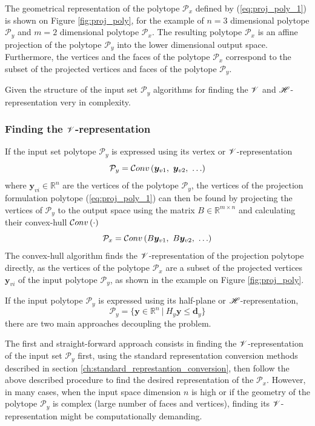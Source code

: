 The geometrical representation of the polytope $\mathcal{P}_x$ defined by (\ref{eq:proj_poly_1}) is shown on Figure \ref{fig:proj_poly}, for the example of $n=3$ dimensional polytope $\mathcal{P}_y$ and $m=2$ dimensional polytope $\mathcal{P}_x$. The resulting polytope $\mathcal{P}_x$ is an affine projection of the polytope $\mathcal{P}_y$ into the lower dimensional output space. Furthermore, the vertices and the faces of the polytope $\mathcal{P}_x$ correspond to the subset of the projected vertices and faces of the polytope $\mathcal{P}_y$. 


Given the structure of the input set $\mathcal{P}_y$ algorithms for finding the $\mathscr{V}$ and $\mathscr{H}$-representation very in complexity. 

\subsubsection{Finding the $\mathscr{V}$-representation}
\label{ch:proj_algos_v}
If the input set polytope $\mathcal{P}_y$ is expressed using its vertex or $\mathscr{V}$-representation
\begin{equation}
    \mathcal{P}_y = \mathcal{C}onv\left( \bm{y}_{v1}, ~ \bm{y}_{v2},~ \ldots\right)
\end{equation}
where $\bm{y}_{vi}\in\mathbb{R}^n$ are the vertices of the polytope $\mathcal{P}_y$, the vertices of the projection formulation polytope (\ref{eq:proj_poly_1}) can then be found by projecting the vertices of $\mathcal{P}_y$ to the output space using the matrix $B \in \mathbb{R}^{m\times n}$ and calculating their convex-hull $\mathcal{C}onv\left(\cdot\right)$
\begin{equation}
    \mathcal{P}_x= \mathcal{C}onv\left( B\bm{y}_{v1}, ~ B\bm{y}_{v2},~ \ldots\right)
\end{equation}
The convex-hull algorithm finds the $\mathscr{V}$-representation of the projection polytope directly, as the vertices of the polytope $\mathcal{P}_x$ are a subset of the projected vertices $\bm{y}_{vi}$ of the input polytope $\mathcal{P}_y$, as shown in the example on Figure \ref{fig:proj_poly}. 

If the input polytope $\mathcal{P}_y$ is expressed using its half-plane or $\mathscr{H}$-representation, 
\begin{equation}
    \mathcal{P}_y = \{ \bm{y}\in\mathbb{R}^n ~|~H_y\bm{y} \leq \bm{d}_y\}
\end{equation}
there are two main approaches decoupling the problem.

The first and straight-forward approach consists in finding the $\mathscr{V}$-representation of the input set $\mathcal{P}_y$ first, using the standard representation conversion methods described in section \ref{ch:standard_represtantion_conversion}, then follow the above described procedure to find the desired representation of the $\mathcal{P}_x$. However, in many cases, when the input space dimension $n$ is high or if the geometry of the polytope  $\mathcal{P}_y$ is complex (large number of faces and vertices), finding its $\mathscr{V}$-representation might be computationally demanding. 

